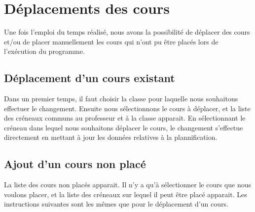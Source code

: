 \section{Déplacements des cours}

Une fois l'emploi du temps réalisé, nous avons la possibilité de déplacer des cours et/ou de placer manuellement les cours qui n'ont pu être placés lors de l'exécution du programme.

\subsection {Déplacement d'un cours existant}

Dans un premier temps, il faut choisir la classe pour laquelle nous souhaitons effectuer le changement. Ensuite nous sélectionnons le cours à déplacer, et la liste des créneaux communs au professeur et à la classe apparait. En sélectionnant le créneau dans lequel nous souhaitons déplacer le cours, le changement s'effectue directement en mettant à jour les données relatives à la plannification.

\subsection {Ajout d'un cours non placé}

La liste des cours non placés apparait. Il n'y a qu'à sélectionner le cours que nous voulons placer, et la liste des créneaux sur lequel il peut être placé apparait. Les instructions suivantes sont les mêmes que pour le déplacement d'un cours.